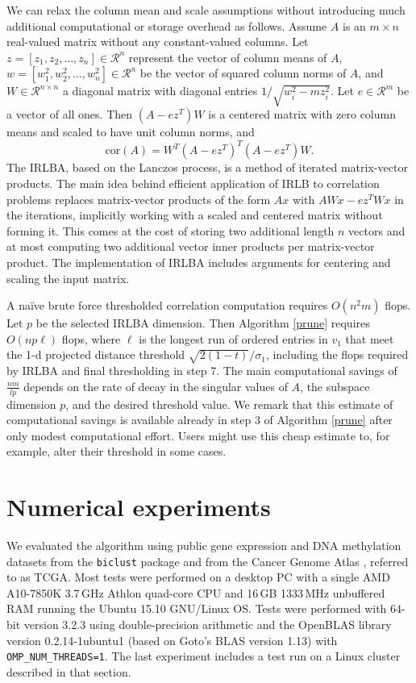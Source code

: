 \documentclass[article]{jss}
\numberwithin{algorithmctr}{section}
\begin{document}
We can relax the column mean and scale assumptions without introducing much
additional computational or storage overhead as follows. Assume $A$ is an
$m\times n$ real-valued matrix without any constant-valued columns. Let
$z=[z_1,z_2,\ldots,z_n]\in\mathcal{R}^n$ represent the vector of column means
of $A$, $w=[w_1^2,w_2^2,\ldots,w_n^2]\in\mathcal{R}^n$
be the vector of squared column norms of $A$, and $W\in\mathcal{R}^{n\times n}$
a diagonal matrix with diagonal entries $1/\sqrt{w_i^2 - m z_i^2}$.  Let
$e\in\mathcal{R}^m$ be a vector of all ones.  Then $(A - ez^T)W$ is a centered
matrix with zero column means and scaled to have unit column norms, and
\[
\mathrm{cor}(A) = W^T (A-ez^T)^T (A-ez^T) W.
\]
The IRLBA, based on the Lanczos process, is a method of iterated matrix-vector
products. The main idea behind efficient application of IRLB to correlation
problems replaces matrix-vector products of the form $Ax$ with $AWx - ez^TWx$ in
the iterations, implicitly working with a scaled and centered matrix without
forming it.  This comes at the cost of storing two additional length $n$ vectors and
at most computing two additional vector inner products per matrix-vector product.
The  implementation \citep{irlbar} of IRLBA includes arguments for centering and
scaling the input matrix.

A na\"ive brute force thresholded correlation computation requires $O(n^2 m)$ flops.
Let $p$ be the selected IRLBA dimension. Then Algorithm \ref{prune} requires
$O(n p \ell)$ flops, where $\ell$ is the longest run of ordered entries in
$v_1$ that meet the 1-d projected distance threshold $\sqrt{2(1-t)}/\sigma_1$,
including the flops required by IRLBA and final thresholding in step 7.  The
main computational savings of $\frac{nm}{lp}$ depends on the rate of decay in
the singular values of $A$, the subspace dimension $p$, and the desired
threshold value. We remark that this estimate of computational savings is
available already in step 3 of Algorithm \ref{prune} after only modest
computational effort. Users might use this cheap estimate to, for example,
alter their threshold in some cases.


\section{Numerical experiments}\label{examples}

We evaluated the algorithm using public gene expression and DNA methylation
datasets from the  {\tt biclust} \citep{biclust} package and from
the Cancer Genome Atlas \citep{gdac}, referred to as TCGA.  Most tests were
performed on a desktop PC with a single AMD A10-7850K 3.7$\,$GHz Athlon
quad-core CPU and 16$\,$GB 1333$\,$MHz unbuffered RAM running the Ubuntu 15.10
GNU/Linux OS. Tests were performed with 64-bit  version 3.2.3 using
double-precision arithmetic and the OpenBLAS library version 0.2.14-1ubuntu1
(based on Goto's BLAS version 1.13) with {\tt OMP\_NUM\_THREADS=1}. The last
experiment includes a test run on a Linux cluster described in that section.
\end{document}

